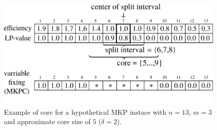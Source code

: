 \begin{figure}[h]
  \centering
  \includegraphics[scale=0.406]{imgs/mkp_3}
  \caption{Example of core for a hypothetical MKP instace with $n=13$, $m=3$ and approximate core size of $5$ ($\delta = 2$).}
  \label{fig:mkpcore}
\end{figure}


